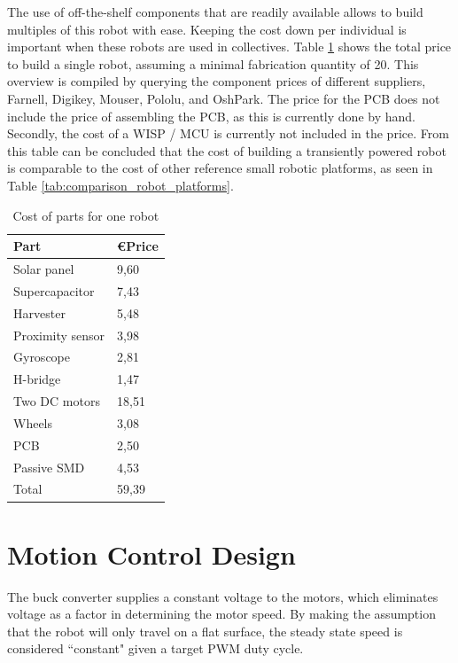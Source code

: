 The use of off-the-shelf components that are readily available allows to build multiples of this robot with ease.
Keeping the cost down per individual is important when these robots are used in collectives.
Table \ref{tab:cost_robot} shows the total price to build a single robot, assuming a minimal fabrication quantity of 20.
This overview is compiled by querying the component prices of different suppliers, Farnell, Digikey, Mouser, Pololu, and OshPark.
The price for the PCB does not include the price of assembling the PCB, as this is currently done by hand.
Secondly, the cost of a WISP / MCU is currently not included in the price.
From this table can be concluded that the cost of building a transiently powered robot is comparable to the cost of other reference small robotic platforms, as seen in Table \ref{tab:comparison_robot_platforms}.


\begin{table}[t]
	\centering
	\caption{Cost of parts for one robot}
	\label{tab:cost_robot}
	\begin{tabular}{|l|l|} 
		\hline
		Part & \euro Price \\
		\hline\hline
		Solar panel & 9,60\\
		Supercapacitor & 7,43\\
		Harvester & 5,48 \\
		Proximity sensor & 3,98 \\
		Gyroscope & 2,81\\	
		H-bridge & 1,47 \\
		Two DC motors & 18,51 \\
		Wheels & 3,08\\
		PCB & 2,50 \\
		Passive SMD & 4,53\\
		\hline \hline
		Total & 59,39 \\
		\hline
	\end{tabular}
\end{table}


\section{Motion Control Design}
\label{sec:dai_control_design}
The buck converter supplies a constant voltage to the motors, which eliminates voltage as a factor in determining the motor speed.
By making the assumption that the robot will only travel on a flat surface, the steady state speed is considered ``constant" given a target PWM duty cycle.

